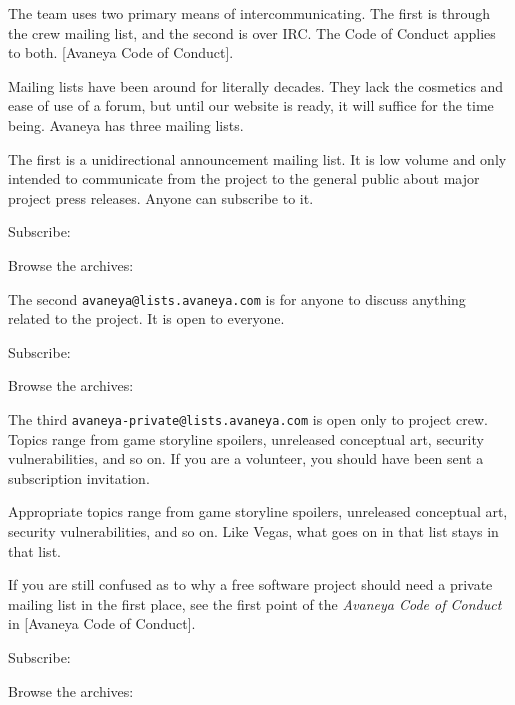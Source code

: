 
The team uses two primary means of intercommunicating. The first is through the crew mailing list, and the second is over IRC. The Code of Conduct applies to both. [Avaneya Code of Conduct].

Mailing lists have been around for literally decades. They lack the cosmetics and ease of use of a forum, but until our website is ready, it will suffice for the time being. Avaneya has three mailing lists. 

The first is a unidirectional announcement mailing list. It is low volume and only intended to communicate from the project to the general public about major project press releases. Anyone can subscribe to it.

Subscribe:\crlf
{} 

Browse the archives:\crlf
{}

The second {\tt avaneya@lists.avaneya.com} is for anyone to discuss anything related to the project. It is open to everyone.

Subscribe:\crlf
{} 

Browse the archives:\crlf
{}

The third {\tt avaneya-private@lists.avaneya.com} is open only to project crew. Topics range from game storyline spoilers, unreleased conceptual art, security vulnerabilities, and so on. If you are a volunteer, you should have been sent a subscription invitation. 

Appropriate topics range from game storyline spoilers, unreleased conceptual art, security vulnerabilities, and so on. Like Vegas, what goes on in that list stays in that list.

If you are still confused as to why a free software project should need a private mailing list in the first place, see the first point of the {\it Avaneya Code of Conduct} in [Avaneya Code of Conduct].

Subscribe:\crlf
{} 

Browse the archives:\crlf
{}

